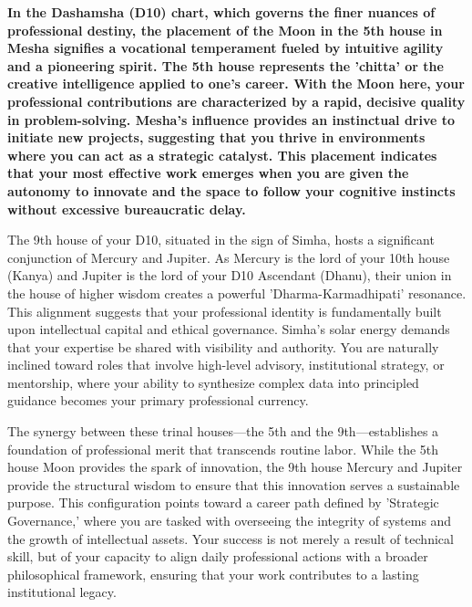 
\label{topic29}

{\fontsize{9.5}{13.8}\selectfont\bfseries\color{DeepSlate} In the Dashamsha (D10) chart, which governs the finer nuances of professional destiny, the placement of the Moon in the 5th house in Mesha signifies a vocational temperament fueled by intuitive agility and a pioneering spirit. The 5th house represents the 'chitta' or the creative intelligence applied to one's career. With the Moon here, your professional contributions are characterized by a rapid, decisive quality in problem-solving. Mesha's influence provides an instinctual drive to initiate new projects, suggesting that you thrive in environments where you can act as a strategic catalyst. This placement indicates that your most effective work emerges when you are given the autonomy to innovate and the space to follow your cognitive instincts without excessive bureaucratic delay.}\par\vspace{2mm}

{\fontsize{9}{13}\selectfont The 9th house of your D10, situated in the sign of Simha, hosts a significant conjunction of Mercury and Jupiter. As Mercury is the lord of your 10th house (Kanya) and Jupiter is the lord of your D10 Ascendant (Dhanu), their union in the house of higher wisdom creates a powerful 'Dharma-Karmadhipati' resonance. This alignment suggests that your professional identity is fundamentally built upon intellectual capital and ethical governance. Simha's solar energy demands that your expertise be shared with visibility and authority. You are naturally inclined toward roles that involve high-level advisory, institutional strategy, or mentorship, where your ability to synthesize complex data into principled guidance becomes your primary professional currency.}\par\vspace{1.8mm}

{\fontsize{9}{13}\selectfont The synergy between these trinal houses---the 5th and the 9th---establishes a foundation of professional merit that transcends routine labor. While the 5th house Moon provides the spark of innovation, the 9th house Mercury and Jupiter provide the structural wisdom to ensure that this innovation serves a sustainable purpose. This configuration points toward a career path defined by 'Strategic Governance,' where you are tasked with overseeing the integrity of systems and the growth of intellectual assets. Your success is not merely a result of technical skill, but of your capacity to align daily professional actions with a broader philosophical framework, ensuring that your work contributes to a lasting institutional legacy.}\par\vspace{1.8mm}

